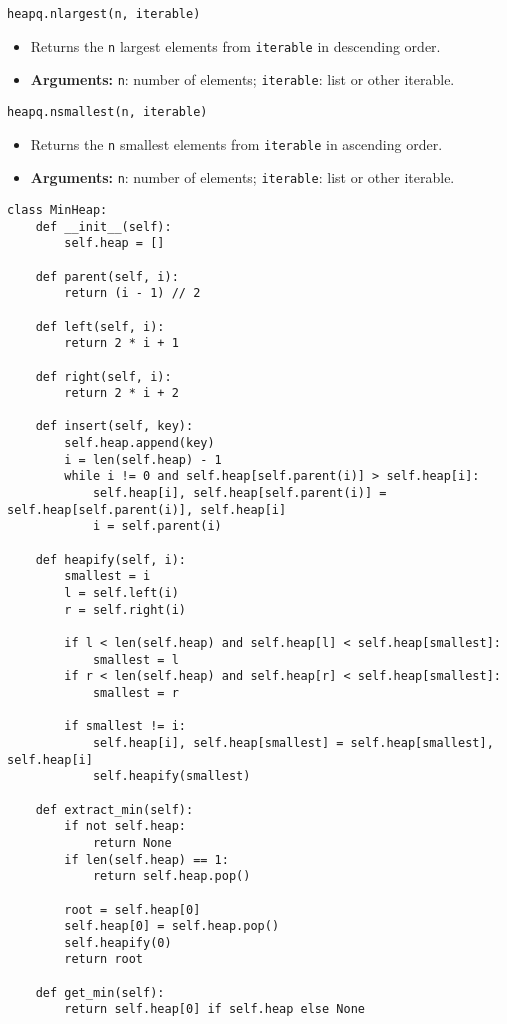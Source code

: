 \begin{summary}
\begin{lstlisting}
heapq.nlargest(n, iterable)
\end{lstlisting}
\begin{itemize}
    \item Returns the \texttt{n} largest elements from \texttt{iterable} in descending order.
    \item \textbf{Arguments:} \texttt{n}: number of elements; \texttt{iterable}: list or other iterable.
\end{itemize}
    
\begin{lstlisting}
heapq.nsmallest(n, iterable)
\end{lstlisting}
\begin{itemize}[noitemsep]
    \item Returns the \texttt{n} smallest elements from \texttt{iterable} in ascending order.
    \item \textbf{Arguments:} \texttt{n}: number of elements; \texttt{iterable}: list or other iterable.
\end{itemize}        
\end{summary}
\newpage

\begin{algo}
\begin{lstlisting}
class MinHeap:
    def __init__(self):
        self.heap = []

    def parent(self, i):
        return (i - 1) // 2

    def left(self, i):
        return 2 * i + 1

    def right(self, i):
        return 2 * i + 2

    def insert(self, key):
        self.heap.append(key)
        i = len(self.heap) - 1
        while i != 0 and self.heap[self.parent(i)] > self.heap[i]:
            self.heap[i], self.heap[self.parent(i)] = self.heap[self.parent(i)], self.heap[i]
            i = self.parent(i)

    def heapify(self, i):
        smallest = i
        l = self.left(i)
        r = self.right(i)

        if l < len(self.heap) and self.heap[l] < self.heap[smallest]:
            smallest = l
        if r < len(self.heap) and self.heap[r] < self.heap[smallest]:
            smallest = r

        if smallest != i:
            self.heap[i], self.heap[smallest] = self.heap[smallest], self.heap[i]
            self.heapify(smallest)

    def extract_min(self):
        if not self.heap:
            return None
        if len(self.heap) == 1:
            return self.heap.pop()

        root = self.heap[0]
        self.heap[0] = self.heap.pop()
        self.heapify(0)
        return root

    def get_min(self):
        return self.heap[0] if self.heap else None
\end{lstlisting}
        
\end{algo}
\newpage

